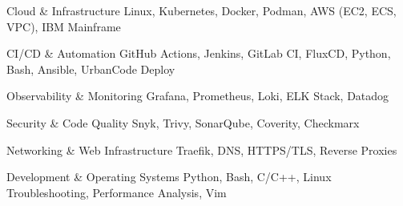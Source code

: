 

\begin{cvskills}

  \cvskill
    {Cloud \& Infrastructure} %
    {Linux, Kubernetes, Docker, Podman, AWS (EC2, ECS, VPC), IBM Mainframe} %

  \cvskill
    {CI/CD \& Automation} %
    {GitHub Actions, Jenkins, GitLab CI, FluxCD, Python, Bash, Ansible, UrbanCode Deploy} %

  \cvskill
    {Observability \& Monitoring} %
    {Grafana, Prometheus, Loki, ELK Stack, Datadog} %

  \cvskill
    {Security \& Code Quality} %
    {Snyk, Trivy, SonarQube, Coverity, Checkmarx} %

  \cvskill
    {Networking \& Web Infrastructure} %
    {Traefik, DNS, HTTPS/TLS, Reverse Proxies} %

  \cvskill
    {Development \& Operating Systems} %
    {Python, Bash, C/C++, Linux Troubleshooting, Performance Analysis, Vim} %

\end{cvskills}




